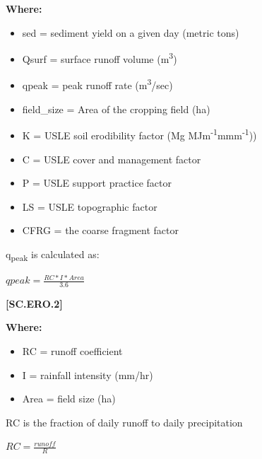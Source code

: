         \textbf{Where:}
            
        \begin{itemize}
            \item sed		=	sediment yield on a given day (metric tons)
            \item Qsurf		=	surface runoff volume (m\textsuperscript{3})
            \item qpeak	 	=	peak runoff rate (m\textsuperscript{3}/sec)
            \item field\_size =	Area of the cropping field (ha)
            \item K		=	USLE soil erodibility factor (Mg MJm\textsuperscript{-1}mmm\textsuperscript{-1}))
            \item C		=	USLE cover and management factor
            \item P		=	USLE support practice factor
            \item LS		=	USLE topographic factor
            \item CFRG  = the coarse fragment factor
        \end{itemize}
    \vspace{0.5cm}

q\textsubscript{peak} is calculated as:
 \vspace{0.5cm}

    \begin{center}
 \(qpeak=\frac{RC*I*Area}{3.6}	\)
    \end{center}
        \vspace{0.5cm} 
    
            {\raggedleft \textbf{[SC.ERO.2]}\par}
            \vspace{0.5cm}

        \textbf{Where:}
            
        \begin{itemize}
            \item RC	=	runoff coefficient
            \item 	I	=	rainfall intensity (mm/hr)
            \item 	Area	=	field size (ha)
        \end{itemize}
    \vspace{0.5cm}

RC is the fraction of daily runoff to daily precipitation   
 \vspace{0.5cm}

    \begin{center}
 \(RC=\frac{runoff}{R}\)
    \end{center}
        \vspace{0.5cm} 
    
